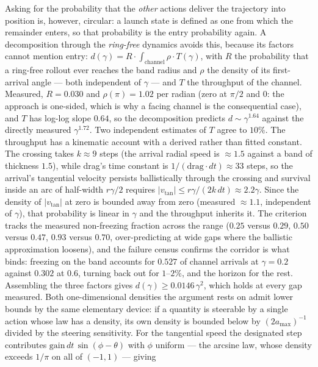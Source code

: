 \documentclass[11pt]{article}
\theoremstyle{remark}
\begin{document}
Asking for the probability that the \emph{other} actions deliver the
trajectory into position is, however, circular: a launch state is defined
as one from which the remainder enters, so that probability is the entry
probability again. A decomposition through the \emph{ring-free} dynamics
avoids this, because its factors cannot mention entry:
$d(\gamma) = R \cdot \int_{\mathrm{channel}} \rho \cdot T(\gamma)$, with
$R$ the probability that a ring-free rollout ever reaches the band radius
and $\rho$ the density of its first-arrival angle --- both independent of
$\gamma$ --- and $T$ the throughput of the channel. Measured,
$R = 0.030$ and $\rho(\pi) = 1.02$ per radian (zero at $\pi/2$ and $0$:
the approach is one-sided, which is why a facing channel is the
consequential case), and $T$ has log-log slope $0.64$, so the
decomposition predicts $d \sim \gamma^{1.64}$ against the directly
measured $\gamma^{1.72}$. Two independent estimates of $T$ agree to
$10\%$. The throughput has a kinematic account with a derived rather than fitted
constant. The crossing takes $k \approx 9$ steps (the arrival radial speed
is ${\approx}1.5$ against a band of thickness $1.5$), while drag's time
constant is $1/(\mathrm{drag}\cdot dt) \approx 33$ steps, so the arrival's
tangential
velocity persists ballistically through the crossing and survival inside
an arc of half-width $r\gamma/2$ requires
$|v_{\mathrm{tan}}| \le r\gamma/(2k\,dt) \approx 2.2\gamma$. Since the
density of $|v_{\mathrm{tan}}|$ at zero is bounded away from zero
(measured ${\approx}1.1$, independent of $\gamma$), that probability is
linear in $\gamma$ and the throughput inherits it. The criterion tracks
the measured non-freezing fraction across the range ($0.25$ versus
$0.29$, $0.50$ versus $0.47$, $0.93$ versus $0.70$, over-predicting at
wide gaps where the ballistic approximation loosens), and the failure
census confirms the corridor is what binds: freezing on the band accounts
for $0.527$ of channel arrivals at $\gamma = 0.2$ against $0.302$ at
$0.6$, turning back out for $1$--$2\%$, and the horizon for the rest.
Assembling the three factors gives $d(\gamma) \ge 0.0146\,\gamma^{2}$,
which holds at every gap measured. Both one-dimensional densities the argument rests on admit lower bounds by
the same elementary device: if a quantity is steerable by a single action
whose law has a density, its own density is bounded below by
$(2a_{\max})^{-1}$ divided by the steering sensitivity. For the tangential
speed the designated step contributes
$\mathrm{gain}\,dt\,\sin(\phi - \theta)$ with $\phi$ uniform --- the
arcsine law, whose density exceeds $1/\pi$ on all of $(-1,1)$ --- giving
\end{document}
